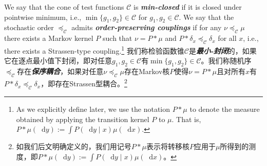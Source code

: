 \documentclass[12pt,letterpaper]{article}
\newenvironment{original}{\color{black}}{}
\newenvironment{translation}{\color{blue}}{}
\theoremstyle{plain}
\theoremstyle{definition}
\theoremstyle{remark}
\newcommand{\C}{\mathcal{C}}
\renewcommand*\d{\mathop{}\!\mathrm{d}}
\theoremstyle{definition}
\begin{document}
\begin{original}
We say that the cone of test functions $\C$ is \textit{\textbf{min-closed}} if it is closed under pointwise minimum, i.e., $\min\{g_1, g_2\} \in \C$ for $g_1, g_2 \in \C$. We say that the stochastic order $\preceq_\C$ admits \textit{\textbf{order-preserving couplings}} if for any $\nu \preceq_\C \mu$ there exists a Markov kernel $P$ such that $\nu = P * \mu$ and $P * \delta_x \preceq_\C \delta_x$ for all $x$, i.e., there exists a Strassen-type coupling.\footnote{As we explicitly define later, we use the notation $P*\mu$ to denote the measure obtained by applying the transition kernel $P$ to $\mu$. That is, $P*\mu(\d y):=\int P(\d y \mid x)\mu(\d x)$.}
\end{original}
\begin{translation}
我们称检验函数锥$\C$是\textit{\textbf{最小-封闭}}的，如果它在逐点最小值下封闭，即对任意$g_1, g_2 \in \C$有$\min\{g_1, g_2\} \in \C$。我们称随机序$\preceq_\C$存在\textit{\textbf{保序耦合}}，如果对任意$\nu \preceq_\C \mu$存在Markov核$P$使得$\nu = P * \mu$且对所有$x$有$P * \delta_x \preceq_\C \delta_x$，即存在Strassen型耦合。\footnote{如我们后文明确定义的，我们用记号$P*\mu$表示将转移核$P$应用于$\mu$所得到的测度，即$P*\mu(\d y):=\int P(\d y \mid x)\mu(\d x)$。}
\end{translation}
\end{document}
